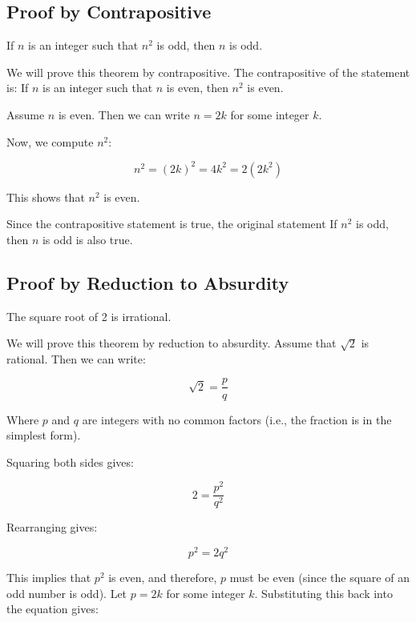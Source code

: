 \subsection{Proof by Contrapositive}

If \(n\) is an integer such that \( n^2 \) is odd, then \(n\) is odd.
\vspace{\baselineskip}

We will prove this theorem by contrapositive. The contrapositive of the statement is: If \(n\) is an 
integer such that \(n\) is even, then \( n^2 \) is even.
\vspace{\baselineskip}

Assume \(n\) is even. Then we can write \( n = 2k \) for some integer \(k\).
\vspace{\baselineskip}

Now, we compute \( n^2 \):
	
\[
	n^2 = {(2k)}^2 = 4k^2 = 2(2k^2)
\]

This shows that \( n^2 \) is even.
\vspace{\baselineskip}

Since the contrapositive statement is true, the original statement If \( n^2 \) is odd, then \(n\) is 
odd is also true.

\QED

\subsection{Proof by Reduction to Absurdity}

The square root of 2 is irrational.
\vspace{\baselineskip}

We will prove this theorem by reduction to absurdity. Assume that \( \sqrt{2} \) is rational. Then we can 
write:

\[
	\sqrt{2} = \frac{p}{q}
\]

Where \(p\) and \(q\) are integers with no common factors (i.e., the fraction is in the simplest 
form).
\vspace{\baselineskip}

Squaring both sides gives:

\[
	2 = \frac{p^2}{q^2}
\]
	
Rearranging gives:

\[
	p^2 = 2q^2
\]
	
This implies that \( p^2 \) is even, and therefore, \(p\) must be even (since the square of an 
odd number is odd). Let \( p = 2k \) for some integer \(k\). Substituting this back into the 
equation gives:

